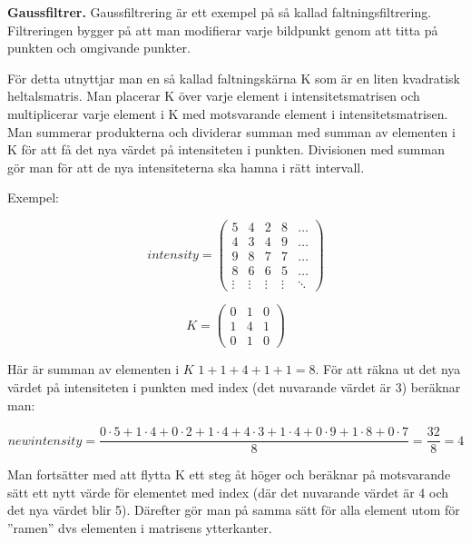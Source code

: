 \Task \textbf{Gaussfiltrer.} Gaussfiltrering är ett exempel på så kallad faltningsfiltrering. Filtreringen bygger på att man modifierar varje bildpunkt genom att titta på punkten och omgivande punkter. 

För detta utnyttjar man en så kallad faltningskärna K som är en liten kvadratisk heltalsmatris. Man placerar K över varje element i intensitetsmatrisen och multiplicerar varje element i K med motsvarande element i intensitetsmatrisen. Man summerar produkterna och dividerar summan med summan av elementen i K för att få det nya värdet på intensiteten i punkten. Divisionen med summan gör man för att de nya intensiteterna ska hamna i rätt intervall.

Exempel:

\begin{minipage}{5cm}
\begin{displaymath}
\mathit{intensity} = \left(
\begin{array}{ccccc}
5 & 4 & 2 & 8 & \ldots \\
4 & 3 & 4 & 9 & \ldots \\
9 & 8 & 7 & 7 & \ldots \\
8 & 6 & 6 & 5 & \ldots \\
\vdots & \vdots & \vdots & \vdots & \ddots
\end{array}
\right)
\end{displaymath}
\end{minipage}\hspace{2cm}
\begin{minipage}{5cm}
\begin{displaymath}
K = \left(
\begin{array}{ccc}
0 & 1 & 0 \\
1 & 4 & 1 \\
0 & 1 & 0
\end{array}
\right)
\end{displaymath}
\end{minipage}

Här är summan av elementen i $K$ $1+1+4+1+1 = 8$. För att räkna ut det nya värdet på intensiteten i punkten med index  (det nuvarande värdet är 3) beräknar man:

\begin{displaymath}
\mathit{newintensity} = \frac{0 \cdot 5 + 1 \cdot 4 + 0 \cdot 2 + 1 \cdot 4 + 4 \cdot 3 + 1 \cdot 4 + 0 \cdot 9 + 1 \cdot 8 + 0 \cdot 7}{8} = \frac{32}{8} = 4
\end{displaymath}


Man fortsätter med att flytta K ett steg åt höger och beräknar på motsvarande sätt ett nytt värde för elementet med index  (där det nuvarande värdet är 4 och det nya värdet blir 5). Därefter gör man på samma sätt för alla element utom för ”ramen” dvs elementen i matrisens ytterkanter.

